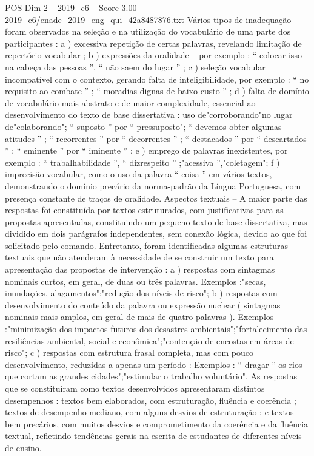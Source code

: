 \begin{textsample}{POS Dim 2 – 2019\_c6 – Score 3.00 – 2019\_c6/enade\_2019\_eng\_qui\_42a8487876.txt}
Vários tipos de inadequação foram observados na seleção e na utilização do vocabulário de uma parte dos participantes : a ) excessiva repetição de certas palavras, revelando limitação de repertório vocabular ; b ) expressões da oralidade – por exemplo : “ colocar isso na cabeça das pessoas ”, “ não saem do lugar ” ; c ) seleção vocabular incompatível com o contexto, gerando falta de inteligibilidade, por exemplo : “ no requisito ao combate ” ; “ moradias dignas de baixo custo ” ; d ) falta de domínio de vocabulário mais abstrato e de maior complexidade, essencial ao desenvolvimento do texto de base dissertativa : uso de"corroborando"no lugar de"colaborando"; “ suposto ” por “ pressuposto"; “ devemos obter algumas atitudes ” ; “ recorrentes ” por “ decorrentes ” ; “ destacados ” por “ descartados ” ; “ eminente ” por “ iminente ” ; e ) emprego de palavras inexistentes, por exemplo : “ trabalhabilidade ”, “ dizrespeito ” ;"acessiva ”,"coletagem"; f ) imprecisão vocabular, como o uso da palavra “ coisa ” em vários textos, demonstrando o domínio precário da norma-padrão da Língua Portuguesa, com presença constante de traços de oralidade.
Aspectos textuais – A maior parte das respostas foi constituída por textos estruturados, com justificativas para as propostas apresentadas, constituindo um pequeno texto de base dissertativa, mas dividido em dois parágrafos independentes, sem conexão lógica, devido ao que foi solicitado pelo comando.
Entretanto, foram identificadas algumas estruturas textuais que não atenderam à necessidade de se construir um texto para apresentação das propostas de intervenção : a ) respostas com sintagmas nominais curtos, em geral, de duas ou três palavras.
Exemplos :"secas, inundações, alagamentos";"redução dos níveis de risco"; b ) respostas com desenvolvimento do conteúdo da palavra ou expressão nuclear ( sintagmas nominais mais amplos, em geral de mais de quatro palavras ).
Exemplos :"minimização dos impactos futuros dos desastres ambientais";"fortalecimento das resiliências ambiental, social e econômica";"contenção de encostas em áreas de risco"; c ) respostas com estrutura frasal completa, mas com pouco desenvolvimento, reduzidas a apenas um período : Exemplos : “ dragar ” os rios que cortam as grandes cidades";"estimular o trabalho voluntário".
As respostas que se constituíram como textos desenvolvidos apresentaram distintos desempenhos : textos bem elaborados, com estruturação, fluência e coerência ; textos de desempenho mediano, com alguns desvios de estruturação ; e textos bem precários, com muitos desvios e comprometimento da coerência e da fluência textual, refletindo tendências gerais na escrita de estudantes de diferentes níveis de ensino.

\end{textsample}

